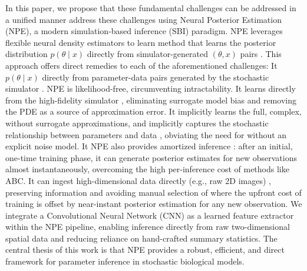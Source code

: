 \documentclass{article}
\providecommand{\DIFaddtex}[1]{{\protect\color{blue} \sf #1}} %
\providecommand{\DIFdeltex}[1]{{\protect\color{red} \scriptsize #1}} %
\providecommand{\DIFaddbegin}{} %
\providecommand{\DIFaddend}{} %
\providecommand{\DIFdelbegin}{} %
\providecommand{\DIFdelend}{} %
\providecommand{\DIFadd}[1]{\texorpdfstring{\DIFaddtex{#1}}{#1}} %
\providecommand{\DIFdel}[1]{\texorpdfstring{\DIFdeltex{#1}}{}} %
\newcommand{\DIFscaledelfig}{0.5}
\newlength{\DIFdelgraphicswidth} %
\newlength{\DIFdelgraphicsheight} %
\newcommand{\DIFaddincludegraphics}[2][]{{\color{blue}\fbox{\DIFOincludegraphics[#1]{#2}}}} %
\newcommand{\DIFdelincludegraphics}[2][]{%
\sbox{\DIFdelgraphicsbox}{\DIFOincludegraphics[#1]{#2}}%
\settoboxwidth{\DIFdelgraphicswidth}{\DIFdelgraphicsbox} %
\settoboxtotalheight{\DIFdelgraphicsheight}{\DIFdelgraphicsbox} %
\scalebox{\DIFscaledelfig}{%
\parbox[b]{\DIFdelgraphicswidth}{\usebox{\DIFdelgraphicsbox}\\[-\baselineskip] \rule{\DIFdelgraphicswidth}{0em}}\llap{\resizebox{\DIFdelgraphicswidth}{\DIFdelgraphicsheight}{%
\setlength{\unitlength}{\DIFdelgraphicswidth}%
\begin{picture}(1,1)%
\thicklines\linethickness{2pt} %
{\color[rgb]{1,0,0}\put(0,0){\framebox(1,1){}}}%
{\color[rgb]{1,0,0}\put(0,0){\line( 1,1){1}}}%
{\color[rgb]{1,0,0}\put(0,1){\line(1,-1){1}}}%
\end{picture}%
}\hspace*{3pt}}} %
} %
\DeclareRobustCommand{\DIFaddbegin}{\DIFOaddbegin \let\includegraphics\DIFaddincludegraphics} %
\DeclareRobustCommand{\DIFaddend}{\DIFOaddend \let\includegraphics\DIFOincludegraphics} %
\DeclareRobustCommand{\DIFdelbegin}{\DIFOdelbegin \let\includegraphics\DIFdelincludegraphics} %
\DeclareRobustCommand{\DIFdelend}{\DIFOaddend \let\includegraphics\DIFOincludegraphics} %
\begin{document}
In this paper, we \DIFdelbegin \DIFdel{propose that these fundamental challenges can be addressed in a unified manner }\DIFdelend \DIFaddbegin \DIFadd{address these challenges }\DIFaddend using Neural Posterior Estimation (NPE), a \DIFdelbegin \DIFdel{modern }\DIFdelend simulation-based inference \DIFdelbegin \DIFdel{(SBI) paradigm. NPE leverages flexible neural density estimators to learn }\DIFdelend \DIFaddbegin \DIFadd{method that learns }\DIFaddend the posterior distribution \DIFdelbegin \DIFdel{$p\left(\theta \mid x\right)$ directly from simulator-generated $(\theta,x)$ pairs . This approach offers direct remedies to each of the aforementioned challenges: 
}%
\DIFdel{It }\DIFdelend \DIFaddbegin \DIFadd{$p(\theta \mid x)$ directly from parameter-data pairs generated by the stochastic simulator \citep{papamakarios2016fast,greenberg2019automatic,Cranmer2020FrontierSBI}. NPE }\DIFaddend is likelihood-free, \DIFdelbegin \DIFdel{circumventing intractability.
	 }%
\DIFdel{It }\DIFdelend learns directly from the high-fidelity simulator \DIFdelbegin \DIFdel{, eliminating surrogate model bias and removing the PDE as a source of approximation error. 
	 }%
\DIFdel{It implicitly learns the full, complex, }\DIFdelend \DIFaddbegin \DIFadd{without surrogate approximations, and implicitly captures the }\DIFaddend stochastic relationship between parameters and data \DIFdelbegin \DIFdel{, obviating the need for }\DIFdelend \DIFaddbegin \DIFadd{without }\DIFaddend an explicit noise model. \DIFdelbegin %
\DIFdel{It }\DIFdelend \DIFaddbegin \DIFadd{NPE also }\DIFaddend provides amortized inference\DIFdelbegin \DIFdel{: after an initial, one-time training phase, it can generate posterior estimates for new observations almost instantaneously, overcoming the high per-inference cost of methods like ABC. }%
\DIFdel{It can ingest high-dimensional data directly (e.g., raw 2D images) }\DIFdelend , \DIFdelbegin \DIFdel{preserving information and avoiding manual selection of }\DIFdelend \DIFaddbegin \DIFadd{where the upfront cost of training is offset by near-instant posterior estimation for any new observation. We integrate a Convolutional Neural Network (CNN) as a learned feature extractor within the NPE pipeline, enabling inference directly from raw two-dimensional spatial data and reducing reliance on hand-crafted }\DIFaddend summary statistics.
\DIFdelbegin %
\DIFdel{The central thesis of this work is that NPE provides a robust, efficient, and direct framework for parameter inference in stochastic biological models. }\DIFdelend \DIFaddbegin 
\end{document}
